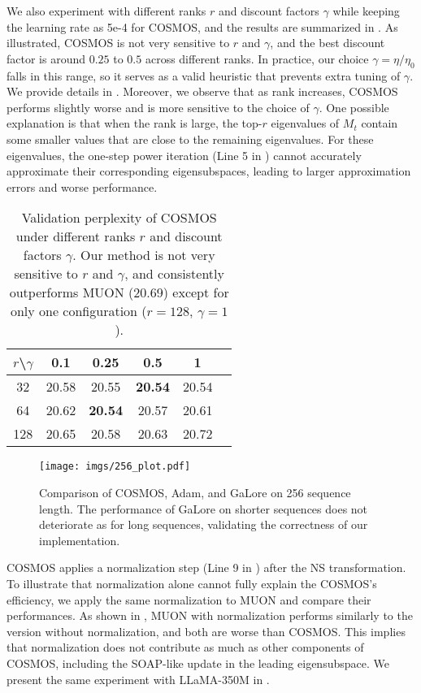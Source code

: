 \vskip2pt
We also experiment with different ranks $r$ and discount factors $\gamma$ while keeping the learning rate as 5e-4 for COSMOS, and the results are summarized in . 
As illustrated, COSMOS is not very sensitive to $r$ and $\gamma$, and the best discount factor is around $0.25$ to $0.5$ across different ranks. 
In practice, our choice $\gamma=\eta/\eta_0$ falls in this range, so it serves as a valid heuristic that prevents extra tuning of $\gamma$.
We provide details in .
Moreover, we observe that as rank increases, COSMOS performs slightly worse and is more sensitive to the choice of $\gamma$. 
One possible explanation is that when the rank is large, the top-$r$ eigenvalues of $M_t$ contain some smaller values that are close to the remaining eigenvalues. 
For these eigenvalues, the one-step power iteration (Line 5 in ) cannot accurately approximate their corresponding eigensubspaces, leading to larger approximation errors and worse performance. 


\begin{table}[htb!]
    \caption{Validation perplexity of COSMOS under different ranks $r$ and discount factors $\gamma$. Our method is not very sensitive to $r$ and $\gamma$, and consistently outperforms MUON (20.69) except for only one configuration ($r=128$, $\gamma=1$). }
    \label{tab:exp-130m-rank-discount}
    \centering
    \begin{tabular}{c|ccccc}
    \toprule
    $r$\textbackslash{$\gamma$} &0.1 & 0.25&0.5 & 1 \\
    \hline
     32& 20.58 & 20.55 & {\bf 20.54} & 20.54 \\
     64& 20.62 & {\bf 20.54} &20.57 &20.61 \\
     128& 20.65 & 20.58&20.63 &20.72 \\
    \bottomrule
    \end{tabular}
\end{table}


\begin{figure}[htb!]
    \centering
    \texttt{[image: imgs/256\_plot.pdf]}
    \caption{Comparison of COSMOS, Adam, and GaLore on 256 sequence length. The performance of GaLore on shorter sequences does not deteriorate as for long sequences, validating the correctness of our implementation. }
    \label{fig:exp-130m-galore}
\end{figure}

\vskip2pt
COSMOS applies a normalization step (Line 9 in ) after the NS transformation. 
To illustrate that normalization alone cannot fully explain the COSMOS's efficiency, we apply the same normalization to MUON and compare their performances. 
As shown in , MUON with normalization performs similarly to the version without normalization, and both are worse than COSMOS. 
This implies that normalization does not contribute as much as other components of COSMOS, including the SOAP-like update in the leading eigensubspace. 
We present the same experiment with LLaMA-350M in .

